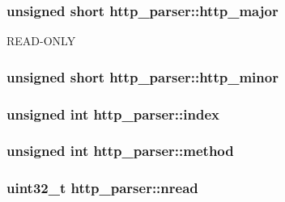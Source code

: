 \hypertarget{structhttp__parser_ac994a4a8268652f5ce82de5bde5c3f9d}{
\subsubsection[{http\-\_\-major}]{\setlength{\rightskip}{0pt plus 5cm}unsigned short http\-\_\-parser\-::http\-\_\-major}}\label{structhttp__parser_ac994a4a8268652f5ce82de5bde5c3f9d}
R\-E\-A\-D-\/\-O\-N\-L\-Y \hypertarget{structhttp__parser_ae8af6433c824f5348773842db62ad4ab}{
\subsubsection[{http\-\_\-minor}]{\setlength{\rightskip}{0pt plus 5cm}unsigned short http\-\_\-parser\-::http\-\_\-minor}}\label{structhttp__parser_ae8af6433c824f5348773842db62ad4ab}
\hypertarget{structhttp__parser_a6f7ba706f975f447b3bf72be97facdf8}{
\subsubsection[{index}]{\setlength{\rightskip}{0pt plus 5cm}unsigned int http\-\_\-parser\-::index}}\label{structhttp__parser_a6f7ba706f975f447b3bf72be97facdf8}
\hypertarget{structhttp__parser_a7955de339fafd81ad54380845913457d}{
\subsubsection[{method}]{\setlength{\rightskip}{0pt plus 5cm}unsigned int http\-\_\-parser\-::method}}\label{structhttp__parser_a7955de339fafd81ad54380845913457d}
\hypertarget{structhttp__parser_a78085ca896bb3b9aa1ecb0f6fddc039d}{
\subsubsection[{nread}]{\setlength{\rightskip}{0pt plus 5cm}uint32\-\_\-t http\-\_\-parser\-::nread}}\label{structhttp__parser_a78085ca896bb3b9aa1ecb0f6fddc039d}
